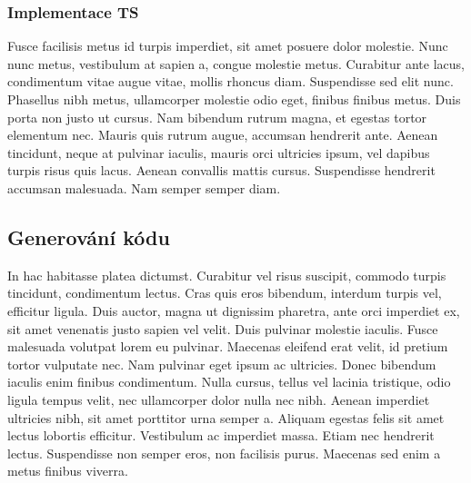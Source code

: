 \documentclass[11pt, a4paper]{article}
\begin{document}
\subsubsection{Implementace TS}
Fusce facilisis metus id turpis imperdiet, sit amet posuere dolor molestie. Nunc nunc metus, vestibulum at sapien a, congue molestie metus. Curabitur ante lacus, condimentum vitae augue vitae, mollis rhoncus diam. Suspendisse sed elit nunc. Phasellus nibh metus, ullamcorper molestie odio eget, finibus finibus metus. Duis porta non justo ut cursus. Nam bibendum rutrum magna, et egestas tortor elementum nec. Mauris quis rutrum augue, accumsan hendrerit ante. Aenean tincidunt, neque at pulvinar iaculis, mauris orci ultricies ipsum, vel dapibus turpis risus quis lacus. Aenean convallis mattis cursus. Suspendisse hendrerit accumsan malesuada. Nam semper semper diam.

\subsection{Generování kódu}
In hac habitasse platea dictumst. Curabitur vel risus suscipit, commodo turpis tincidunt, condimentum lectus. Cras quis eros bibendum, interdum turpis vel, efficitur ligula. Duis auctor, magna ut dignissim pharetra, ante orci imperdiet ex, sit amet venenatis justo sapien vel velit. Duis pulvinar molestie iaculis. Fusce malesuada volutpat lorem eu pulvinar. Maecenas eleifend erat velit, id pretium tortor vulputate nec. Nam pulvinar eget ipsum ac ultricies. Donec bibendum iaculis enim finibus condimentum. Nulla cursus, tellus vel lacinia tristique, odio ligula tempus velit, nec ullamcorper dolor nulla nec nibh. Aenean imperdiet ultricies nibh, sit amet porttitor urna semper a. Aliquam egestas felis sit amet lectus lobortis efficitur. Vestibulum ac imperdiet massa. Etiam nec hendrerit lectus. Suspendisse non semper eros, non facilisis purus. Maecenas sed enim a metus finibus viverra. 
\newpage
\end{document}
